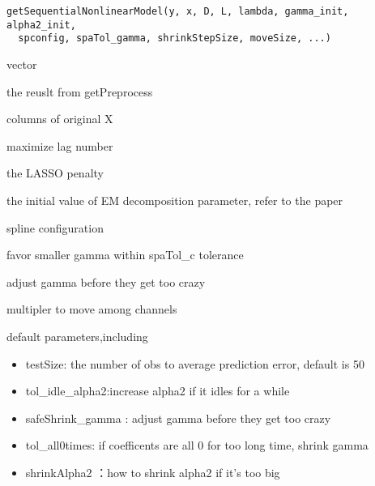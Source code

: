 \documentclass[a4paper]{book}
\begin{document}
%
\begin{Usage}
\begin{verbatim}
getSequentialNonlinearModel(y, x, D, L, lambda, gamma_init, alpha2_init,
  spconfig, spaTol_gamma, shrinkStepSize, moveSize, ...)
\end{verbatim}
\end{Usage}
%
\begin{Arguments}
\begin{ldescription}
\item[\code{y}] vector

\item[\code{x}] the reuslt from getPreprocess 

\item[\code{D}] columns of original X

\item[\code{L}] maximize lag number

\item[\code{lambda}] the LASSO penalty

\item[\code{alpha2\_init}] the initial value of EM decomposition parameter, refer to the paper

\item[\code{spconfig}] spline configuration

\item[\code{spaTol\_gamma}] favor smaller gamma within spaTol\_c tolerance

\item[\code{shrinkStepSize}] adjust gamma before they get too crazy

\item[\code{moveSize}] multipler to move among channels

\item[\code{...}] default parameters,including
\begin{itemize}

\item testSize: the number of obs to average prediction error, default is 50
\item tol\_idle\_alpha2:increase alpha2 if it idles for a while
\item safeShrink\_gamma : adjust gamma before they get too crazy
\item tol\_all0times: if coefficents are all 0 for too long time, shrink gamma
\item shrinkAlpha2 ：how to shrink alpha2 if it's too big

\end{itemize}

\end{ldescription}
\end{Arguments}
\end{document}
